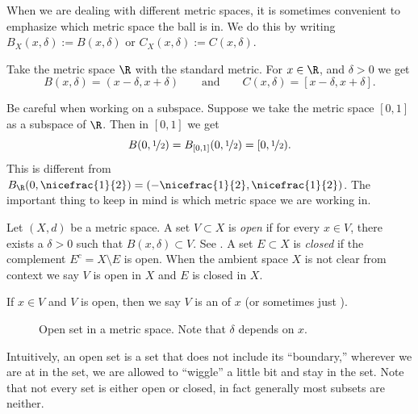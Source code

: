 \documentclass[12pt]{book}
\begin{document}
When we are dealing with different metric spaces, it is sometimes 
convenient to emphasize which metric space the ball is in.
We do this by
writing $B_X(x,\delta) := B(x,\delta)$ or $C_X(x,\delta) := C(x,\delta)$.

\begin{example}
Take the metric space $\R$ with the standard metric.
For
$x \in \R$, and $\delta > 0$ we get 
\begin{equation*}
B(x,\delta) = (x-\delta,x+\delta) \qquad \text{and} \qquad
C(x,\delta) = [x-\delta,x+\delta] .
\end{equation*}
\end{example}

\begin{example}
Be careful when working on a subspace.
Suppose we take the
metric space $[0,1]$ as a subspace of $\R$.
Then in $[0,1]$
we get
\begin{equation*}
B(0,\nicefrac{1}{2}) = B_{[0,1]}(0,\nicefrac{1}{2}) = [0,\nicefrac{1}{2}) .
\end{equation*}
This is different from $B_{\R}(0,\nicefrac{1}{2}) =
(-\nicefrac{1}{2},\nicefrac{1}{2})$.
The important thing to keep in mind is which metric space we are working
in.
\end{example}

\begin{defn}
Let $(X,d)$ be a metric space.
A set $V \subset X$
is \emph{open}
if for every $x \in V$, there exists a $\delta > 0$ such that
$B(x,\delta) \subset V$.
See .
A set $E \subset X$ is 
\emph{closed} if the complement $E^c = X \setminus E$ is open.
When the ambient space $X$ is not clear from context we say
$V$ is open in $X$ and $E$ is closed in $X$.

If $x \in V$ and $V$ is open, then we say 
$V$ is an \emph{} of $x$ (or
sometimes just \emph{}).
\end{defn}

\begin{figure}[h!t]
\begin{center}

\caption{Open set in a metric space.
Note that $\delta$ depends on $x$.\label{fig:msopenset}}
\end{center}
\end{figure}

Intuitively, an open set is a set that does not include its ``boundary,''
wherever we are at in the set, we are allowed to ``wiggle'' a little bit and
stay in the set.
Note that not every set is either open or closed, in fact generally
most subsets are neither.
\end{document}
